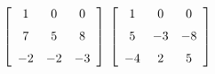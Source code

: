 {$\left[ \begin {array}{ccc} 1&0&0\\\noalign{\medskip}7&5&8
\\\noalign{\medskip}-2&-2&-3\end {array} \right]$ 
}
{$ \left[ \begin {array}{ccc} 1&0&0\\\noalign{\medskip}5&-3&-8
\\\noalign{\medskip}-4&2&5\end {array} \right]$}
